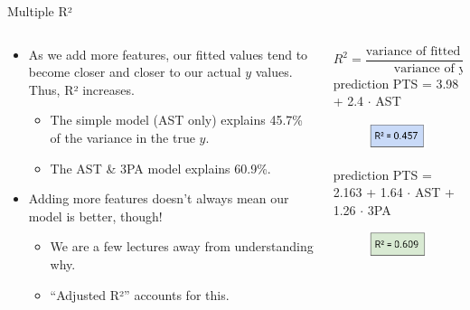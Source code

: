 \documentclass[aspectratio=169]{../latex_main/tntbeamer}  %
\begin{document}
	
	\begin{frame}{Multiple R²}
	    \begin{columns}
	        \begin{column}{.6\textwidth}
	                \begin{itemize}
	                    \item As we add more features, our fitted values tend to become closer and closer to our actual $y$ values. Thus, R² increases.
	                    \begin{itemize}
	                        \item The simple model (AST only) explains 45.7\% of the variance in the true $y$.
	                        \item The AST \& 3PA model explains 60.9\%.
	                    \end{itemize}
	                    \item Adding more features doesn’t always mean our model is better, though!
	                    \begin{itemize}
	                        \item We are a few lectures away from understanding why.  
	                        \item “Adjusted R²” accounts for this.
	                    \end{itemize}
	                \end{itemize}
	        \end{column}
	            
	        \begin{column}{.4\textwidth}
	        \vspace{-1em}
	                \begin{equation*}
	                     R^2 = \frac{\text{variance of fitted values}}{\text{variance of y}}
	                 \end{equation*}
	            prediction PTS = 3.98 + 2.4 $\cdot$ AST
	            \begin{figure}
	                \includegraphics[scale=.4]{Bild14}
	            \end{figure}
	            
	            prediction PTS = 2.163 + 1.64 $\cdot$ AST + 1.26 $\cdot$ 3PA
	             \begin{figure}
	                \includegraphics[scale=.4]{Bild15}
	            \end{figure}
	        \end{column}
	    \end{columns}
	\end{frame}
\end{document}
